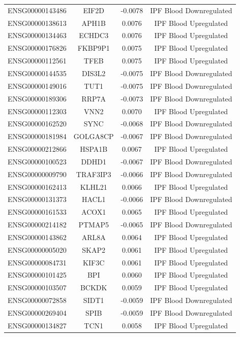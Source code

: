 \documentclass[
]{article}
\begin{document}
\begin{singlespace}
\begin{longtable}[t]{lccc}
ENSG00000143486 & EIF2D & -0.0078 & IPF Blood Downregulated\\
ENSG00000138613 & APH1B & 0.0076 & IPF Blood Upregulated\\
ENSG00000134463 & ECHDC3 & 0.0076 & IPF Blood Upregulated\\
ENSG00000176826 & FKBP9P1 & 0.0075 & IPF Blood Upregulated\\
ENSG00000112561 & TFEB & 0.0075 & IPF Blood Upregulated\\
\addlinespace
ENSG00000144535 & DIS3L2 & -0.0075 & IPF Blood Downregulated\\
ENSG00000149016 & TUT1 & -0.0075 & IPF Blood Downregulated\\
ENSG00000189306 & RRP7A & -0.0073 & IPF Blood Downregulated\\
ENSG00000112303 & VNN2 & 0.0070 & IPF Blood Upregulated\\
ENSG00000162520 & SYNC & -0.0068 & IPF Blood Downregulated\\
\addlinespace
ENSG00000181984 & GOLGA8CP & -0.0067 & IPF Blood Downregulated\\
ENSG00000212866 & HSPA1B & 0.0067 & IPF Blood Upregulated\\
ENSG00000100523 & DDHD1 & -0.0067 & IPF Blood Downregulated\\
ENSG00000009790 & TRAF3IP3 & -0.0066 & IPF Blood Downregulated\\
ENSG00000162413 & KLHL21 & 0.0066 & IPF Blood Upregulated\\
\addlinespace
ENSG00000131373 & HACL1 & -0.0066 & IPF Blood Downregulated\\
ENSG00000161533 & ACOX1 & 0.0065 & IPF Blood Upregulated\\
ENSG00000214182 & PTMAP5 & -0.0065 & IPF Blood Downregulated\\
ENSG00000143862 & ARL8A & 0.0064 & IPF Blood Upregulated\\
ENSG00000005020 & SKAP2 & 0.0061 & IPF Blood Upregulated\\
\addlinespace
ENSG00000084731 & KIF3C & 0.0061 & IPF Blood Upregulated\\
ENSG00000101425 & BPI & 0.0060 & IPF Blood Upregulated\\
ENSG00000103507 & BCKDK & 0.0059 & IPF Blood Upregulated\\
ENSG00000072858 & SIDT1 & -0.0059 & IPF Blood Downregulated\\
ENSG00000269404 & SPIB & -0.0059 & IPF Blood Downregulated\\
\addlinespace
ENSG00000134827 & TCN1 & 0.0058 & IPF Blood Upregulated\\

\end{longtable}
\end{singlespace}
\end{document}
